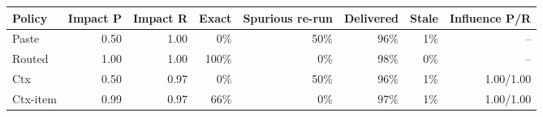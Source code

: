 \begin{tabular}{@{}lrrrrrrr@{}}
\toprule
Policy & Impact P & Impact R & Exact & Spurious re-run & Delivered & Stale & Influence P/R \\
\midrule
Paste & 0.50 & 1.00 & 0\% & 50\% & 96\% & 1\% & -- \\
Routed & 1.00 & 1.00 & 100\% & 0\% & 98\% & 0\% & -- \\
Ctx & 0.50 & 0.97 & 0\% & 50\% & 96\% & 1\% & 1.00/1.00 \\
Ctx-item & 0.99 & 0.97 & 66\% & 0\% & 97\% & 1\% & 1.00/1.00 \\
\bottomrule
\end{tabular}
